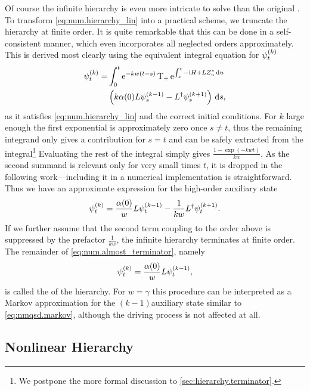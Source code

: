 Of course the infinite hierarchy is even more intricate to solve than the original \NMSSE\@.
To transform \autoref{eq:num.hierarchy_lin} into a practical scheme, we truncate the hierarchy at finite order.
It is quite remarkable that this can be done in a self-consistent manner, which even incorporates all neglected orders approximately.
This is derived most clearly using the equivalent integral equation for $\psit[k]$
\begin{align}
  \psit[k] = &\int_0^t \exp[-kw(t-s)] \Texp[\int_s^t -\ii\Hsys + L\ZZ_u \dd u] \nonumber \\
  &\left( k \alpha(0)L\psi_s^{(k-1)} - \adj{L} \psi_s^{(k+1)} \right) \dd s,
  \label{eq:num.terminator_integral}
\end{align}
as it satisfies \autoref{eq:num.hierarchy_lin} and the correct initial conditions.
For $k$ large enough the first exponential is approximately zero once $s \neq t$, thus the remaining integrand only gives a contribution for $s = t$ and can be safely extracted from the integral\footnote{%
  We postpone the more formal discussion to \autoref{sec:hierarchy.terminator}.
}
Evaluating the rest of the integral simply gives $\frac{1 - \exp(-kwt)}{kw}$.
As the second summand is relevant only for very small times $t$, it is dropped in the following work---including it in a numerical implementation is straightforward.
Thus we have an approximate expression for the high-order auxiliary state
\begin{equation}
  \psit[k] = \frac{\alpha(0)}{w} L\psit[k-1] - \frac{1}{kw} \adj{L} \psit[k+1].
  \label{eq:num.almost_terminator}
\end{equation}
If we further assume that the second term coupling to the order above is suppressed by the prefactor $\frac{1}{kw}$, the infinite hierarchy terminates at finite order.
The remainder of \autoref{eq:num.almost_terminator}, namely
\begin{equation}
  \psit[k] = \frac{\alpha(0)}{w} L \psit[k-1],
  \label{eq:num.terminator}
\end{equation}
is called the  of the hierarchy.
For $w = \gamma$ this procedure can be interpreted as a Markov approximation for the $(k-1)$\th auxiliary state similar to \autoref{eq:nmqsd.markov}, although the driving process is not affected at all.



\subsection{Nonlinear Hierarchy}
\label{sub:num.sheom.nonlin}

